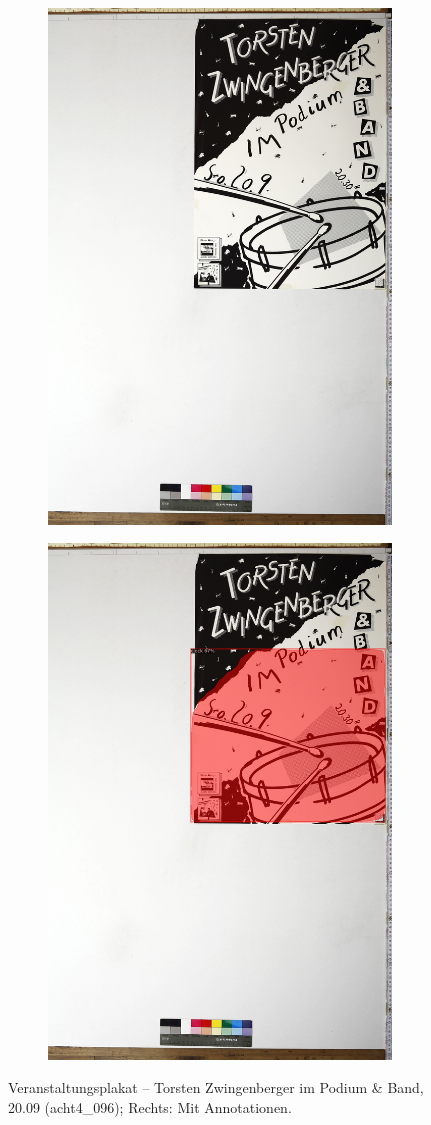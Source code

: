 \documentclass[a4paper,12pt,ngerman]{article}
\begin{document}
\newpage
\begin{landscape}
\begin{figure}[ht]
	\begin{subfigure}[b]{0.5\linewidth}
	\centering
	\includegraphics[height=\linewidth]{Abbildung_18_(acht4_096)}
	\end{subfigure}
	\begin{subfigure}[b]{0.5\linewidth}
	\centering
	\includegraphics[height=\linewidth]{Abbildung_18_(acht4_096)_with_detections}
	\end{subfigure}
	\caption{Veranstaltungsplakat – Torsten Zwingenberger im Podium \& Band, 20.09 (acht4\_096); Rechts: Mit Annotationen.}
\end{figure}
\end{landscape}
\end{document}
